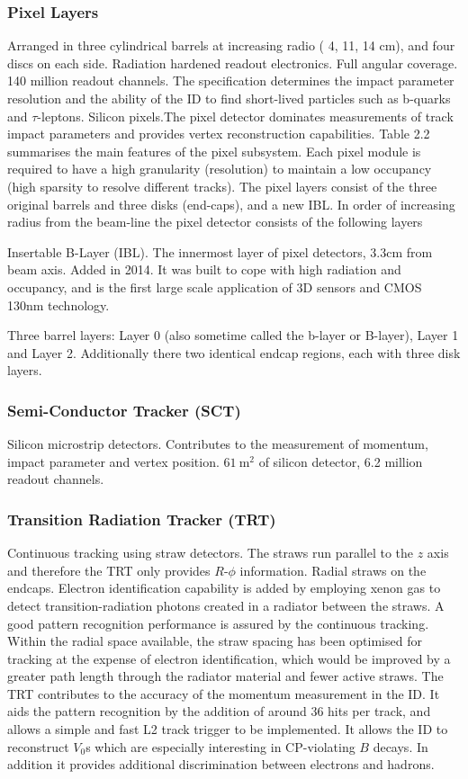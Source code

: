 \subsubsection{Pixel Layers}
Arranged in three cylindrical barrels at increasing radio ( 4, 11, 14 cm), and four discs on each side. Radiation hardened readout electronics. Full angular coverage. 140 million readout channels. The specification determines the impact parameter resolution and the ability of the ID to find short-lived particles such as b-quarks and $\tau$-leptons. Silicon pixels.The pixel detector dominates measurements of track impact parameters and provides vertex reconstruction capabilities. Table 2.2 summarises the main features of the pixel subsystem. Each pixel module is required to have a high granularity (resolution) to maintain a low occupancy (high sparsity to resolve different tracks). The pixel layers consist of the three original barrels and three disks (end-caps), and a new IBL. In order of increasing radius from the beam-line the pixel detector consists of the following layers

Insertable B-Layer (IBL). The innermost layer of pixel detectors, 3.3cm from beam axis. Added in 2014. It was built to cope with high radiation and occupancy, and is the first large scale application of 3D sensors and CMOS 130nm technology.

Three barrel layers: Layer 0 (also sometime called the b-layer or B-layer), Layer 1 and Layer 2. Additionally there two identical endcap regions, each with three disk layers.


\subsubsection{Semi-Conductor Tracker (SCT)}
Silicon microstrip detectors. Contributes to the measurement of momentum, impact parameter and vertex position. $61 ~\textrm{m}^2$ of silicon detector, 6.2 million readout channels.

\subsubsection{Transition Radiation Tracker (TRT)}
Continuous tracking using straw detectors. The straws run parallel to the $z$ axis and therefore the TRT only provides $R$\nobreakdash-$\phi$ information. Radial straws on the endcaps. Electron identification capability is added by employing xenon gas to detect transition-radiation photons created in a radiator between the straws. A good pattern recognition performance is assured by the continuous tracking. Within the radial space available, the straw spacing has been optimised for tracking at the expense of electron
identification, which would be improved by a greater path length through the radiator material and fewer active straws. The TRT contributes to the accuracy of the momentum measurement in the ID. It aids the pattern recognition by the addition of around 36 hits per track, and allows a simple and fast L2 track trigger to be implemented. It allows the ID to reconstruct $V_0$s which are especially interesting in CP-violating $B$ decays. In addition it provides additional discrimination between electrons and hadrons.


